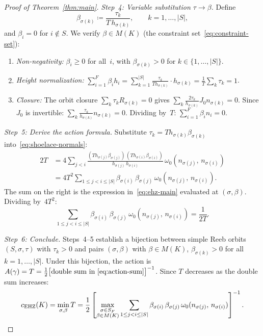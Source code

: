 \begin{proof}[Proof of Theorem~\ref{thm:main}]
\emph{Step~4: Variable substitution $\tau \to \beta$.}
Define
\begin{equation}\label{eq:beta-def}
  \beta_{\sigma(k)} \coloneqq
    \frac{\tau_k}{T\, h_{\sigma(k)}},
  \qquad k = 1, \ldots, |S|,
\end{equation}
and $\beta_i = 0$ for $i \notin S$.
We verify $\beta \in M(K)$
(the constraint set~\eqref{eq:constraint-set}):
\begin{enumerate}
\item \emph{Non-negativity:}
  $\beta_i \geq 0$ for all~$i$, with
  $\beta_{\sigma(k)} > 0$ for $k \in \{1,\ldots,|S|\}$.
\item \emph{Height normalization:}
  $\displaystyle\sum_{i=1}^F \beta_i h_i
  = \sum_{k=1}^{|S|}
    \frac{\tau_k}{T h_{\sigma(k)}} \cdot h_{\sigma(k)}
  = \frac{1}{T} \sum_k \tau_k = 1$.
\item \emph{Closure:}
  The orbit closure
  $\sum_k \tau_k R_{\sigma(k)} = 0$ gives
  $\sum_k \frac{2\tau_k}{h_{\sigma(k)}} J_0 n_{\sigma(k)} = 0$.
  Since $J_0$ is invertible:
  $\sum_k \frac{\tau_k}{h_{\sigma(k)}} n_{\sigma(k)} = 0$.
  Dividing by~$T$:
  $\sum_{i=1}^F \beta_i n_i = 0$.
\end{enumerate}

\emph{Step~5: Derive the action formula.}
Substitute $\tau_k = T h_{\sigma(k)} \beta_{\sigma(k)}$
into~\eqref{eq:shoelace-normals}:
\begin{align*}
  2T &= 4 \sum_{j < i}
    \frac{(T h_{\sigma(j)} \beta_{\sigma(j)})\,
          (T h_{\sigma(i)} \beta_{\sigma(i)})}
         {h_{\sigma(j)}\, h_{\sigma(i)}}\,
    \omega_0(n_{\sigma(j)},\, n_{\sigma(i)}) \\
  &= 4T^2 \sum_{1 \leq j < i \leq |S|}
    \beta_{\sigma(i)}\, \beta_{\sigma(j)}\,
    \omega_0(n_{\sigma(j)},\, n_{\sigma(i)}).
\end{align*}
The sum on the right is the expression
in~\eqref{eq:ehz-main} evaluated at $(\sigma, \beta)$.
Dividing by~$4T^2$:
\begin{equation}\label{eq:action-sum}
  \sum_{1 \leq j < i \leq |S|}
    \beta_{\sigma(i)}\, \beta_{\sigma(j)}\,
    \omega_0(n_{\sigma(j)},\, n_{\sigma(i)})
  = \frac{1}{2T}.
\end{equation}

\emph{Step~6: Conclude.}
Steps~4--5 establish a bijection between simple Reeb orbits
$(S, \sigma, \tau)$ with $\tau_k > 0$ and pairs
$(\sigma, \beta)$ with $\beta \in M(K)$,
$\beta_{\sigma(k)} > 0$ for all $k = 1, \ldots, |S|$.
Under this bijection, the action is
$A(\gamma) = T = \frac{1}{2} \bigl[
  \text{double sum in~\eqref{eq:action-sum}}
\bigr]^{-1}$.
Since $T$ decreases as the double sum increases:
\[
  c_{\mathrm{EHZ}}(K)
  = \min_{\sigma, \beta} T
  = \frac{1}{2} \left[
    \max_{\substack{\sigma \in S_F \\ \beta \in M(K)}}
    \sum_{1 \leq j < i \leq |S|}
      \beta_{\sigma(i)}\, \beta_{\sigma(j)}\,
      \omega_0(n_{\sigma(j)},\, n_{\sigma(i)})
  \right]^{-1}.
  \qedhere
\]
\end{proof}

